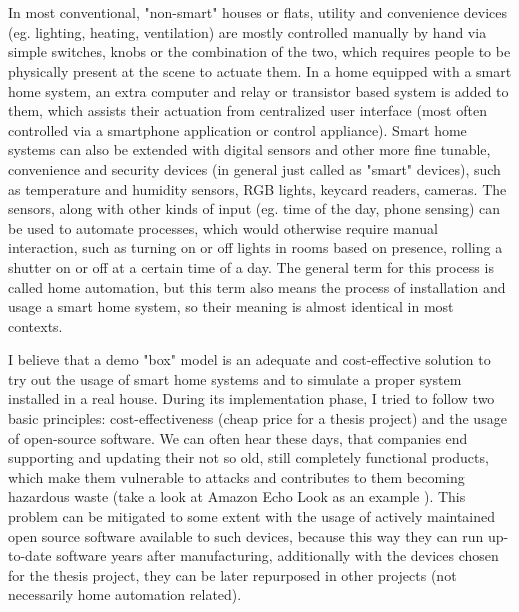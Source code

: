 \chapter{\bevezetes}

In most conventional, "non-smart" houses or flats, utility and convenience devices (eg. lighting, heating, ventilation) are mostly controlled manually by hand via simple switches, knobs or the combination of the two, which requires people to be physically present at the scene to actuate them. In a home equipped with a smart home system, an extra computer and relay or transistor based system is added to them, which assists their actuation from centralized user interface (most often controlled via a smartphone application or control appliance). Smart home systems can also be extended with digital sensors and other more fine tunable, convenience and security devices (in general just called as "smart" devices), such as temperature and humidity sensors, RGB lights, keycard readers, cameras. The sensors, along with other kinds of input (eg. time of the day, phone sensing) can be used to automate processes, which would otherwise require manual interaction, such as turning on or off lights in rooms based on presence, rolling a shutter on or off at a certain time of a day. The general term for this process is called home automation, but this term also means the process of installation and usage a smart home system, so their meaning is almost identical in most contexts.

I believe that a demo "box" model is an adequate and cost-effective solution to try out the usage of smart home systems and to simulate a proper system installed in a real house. During its implementation phase, I tried to follow two basic principles: cost-effectiveness (cheap price for a thesis project) and the usage of open-source software. We can often hear these days, that companies end supporting and updating their not so old, still completely functional products, which make them vulnerable to attacks and contributes to them becoming hazardous waste (take a look at Amazon Echo Look as an example \cite{VergeAmazonEchoLook}). This problem can be mitigated to some extent with the usage of actively maintained open source software available to such devices, because this way they can run up-to-date software years after manufacturing, additionally with the devices chosen for the thesis project, they can be later repurposed in other projects (not necessarily home automation related).

